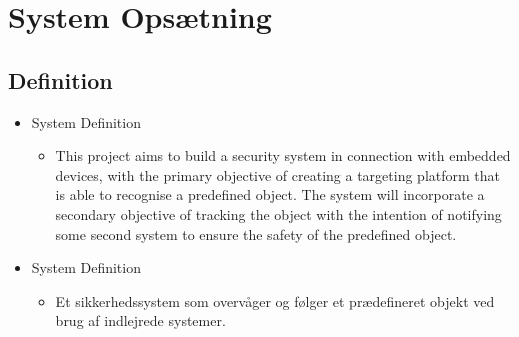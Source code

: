 \section{System Opsætning}
\subsection{Definition}  
\begin{frame}[fragile]{\insertsection}
  \tableofcontents[currentsection]
\end{frame}

\begin{frame}[fragile]{\insertsection}{\insertsubsection}
  \begin{itemize}
    \item System Definition
    \begin{itemize}
      \item This project aims to build a security system in connection with embedded devices, with the primary objective of creating a targeting platform that is able to recognise a predefined object. The system will incorporate a secondary objective of tracking the object with the intention of notifying some second system to ensure the safety of the predefined object.
    \end{itemize}
  \end{itemize}
\end{frame}

\begin{frame}[fragile]{\insertsection}{\insertsubsection}
  \begin{itemize}
    \item System Definition
    \begin{itemize}
      \item Et sikkerhedssystem som overvåger og følger et prædefineret objekt ved brug af indlejrede systemer.
    \end{itemize}
  \end{itemize}
\end{frame}


